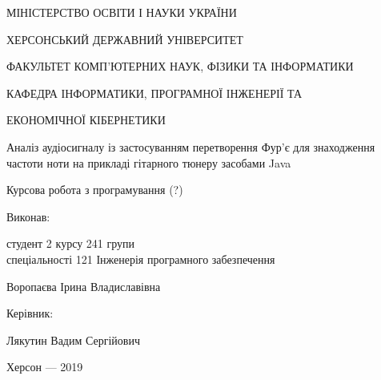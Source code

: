 \thispagestyle{empty}

{\centering
МІНІСТЕРСТВО ОСВІТИ І НАУКИ УКРАЇНИ

ХЕРСОНСЬКИЙ ДЕРЖАВНИЙ УНІВЕРСИТЕТ

ФАКУЛЬТЕТ КОМП'ЮТЕРНИХ НАУК, ФІЗИКИ ТА ІНФОРМАТИКИ

КАФЕДРА ІНФОРМАТИКИ, ПРОГРАМНОЇ ІНЖЕНЕРІЇ ТА 

ЕКОНОМІЧНОЇ КІБЕРНЕТИКИ

\vfill

Аналіз аудіосигналу із застосуванням перетворення Фур'є для знаходження частоти ноти на прикладі гітарного тюнеру засобами Java

Курсова робота з програмування (?)

}

\vfill

\hfill\begin{minipage}[t]{0.6\textwidth}
Виконав: 

студент 2 курсу 241 групи \\ спеціальності 121 Інженерія програмного забезпечення

Воропаєва Ірина Владиславівна

Керівник:

Лякутин Вадим Сергійович

\end{minipage}

\vfill

{\centering
Херсон --- 2019

}